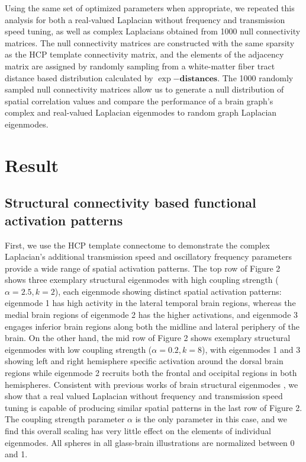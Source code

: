 \documentclass{article}
\begin{document}
Using the same set of optimized parameters when appropriate, we repeated this analysis for both a real-valued Laplacian without frequency and transmission speed tuning, as well as complex Laplacians obtained from 1000 null connectivity matrices. The null connectivity matrices are constructed with the same sparsity as the HCP template connectivity matrix, and the elements of the adjacency matrix are assigned by randomly sampling from a white-matter fiber tract distance based distribution calculated by $\exp{-\mathbf{distances}}$. The 1000 randomly sampled null connectivity matrices allow us to generate a null distribution of spatial correlation values and compare the performance of a brain graph's complex and real-valued Laplacian eigenmodes to random graph Laplacian eigenmodes.

\section{Result}

\subsection{Structural connectivity based functional activation patterns}
First, we use the HCP template connectome to demonstrate the complex Laplacian's additional transmission speed and oscillatory frequency parameters provide a wide range of spatial activation patterns. The top row of Figure 2 shows three exemplary structural eigenmodes with high coupling strength ($\alpha = 2.5, k = 2$), each eigenmode showing distinct spatial activation patterns: eigenmode 1 has high activity in the lateral temporal brain regions, whereas the medial brain regions of eigenmode 2 has the higher activations, and eigenmode 3 engages inferior brain regions along both the midline and lateral periphery of the brain. On the other hand, the mid row of Figure 2 shows exemplary structural eigenmodes with low coupling strength ($\alpha = 0.2,k = 8$), with eigenmodes 1 and 3 showing left and right hemisphere specific activation around the dorsal brain regions while eigenmode 2 recruits both the frontal and occipital regions in both hemispheres. Consistent with previous works of brain structural eigenmodes \cite{Atasoy2016}, we show that a real valued Laplacian without frequency and transmission speed tuning is capable of producing similar spatial patterns in the last row of Figure 2. The coupling strength parameter $\alpha$ is the only parameter in this case, and we find this overall scaling has very little effect on the elements of individual eigenmodes. All spheres in all glass-brain illustrations are normalized between 0 and 1. 
\end{document}

